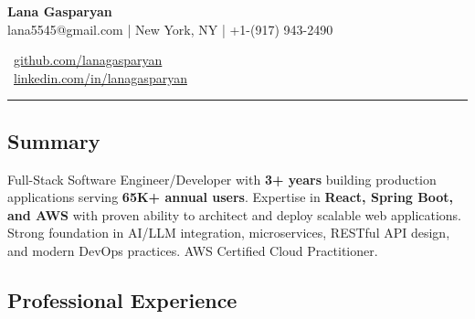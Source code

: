 \documentclass[11pt,letterpaper]{article}
\newcommand{\normalsizesection}{\normalsize}
\newcommand{\smallersection}{\small}
\newcommand{\sectionbox}[1]{%
    \vspace{0.1em}
    \begin{tcolorbox}[
        colback=sectionbg,
        colframe=sectionbg,
        width=\textwidth,
        left=5pt,
        right=5pt,
        top=2pt,
        bottom=2pt,
        boxrule=0pt,
        arc=0pt,
        boxsep=0pt,
    ]
    \section*{#1}
    \end{tcolorbox}
    \vspace{-0.4em}
}
\newcommand{\iconlink}[3]{%
    #1~\href{#2}{#3}%
}
\begin{document}
\begin{minipage}[t]{0.6\textwidth}
    \vspace{0pt}
    \fontsize{24pt}{28pt}\selectfont\textbf{\color{namecolor}Lana Gasparyan}\\[8pt]
    \footnotesize lana5545@gmail.com | New York, NY | +1-(917) 943-2490
\end{minipage}%
\begin{minipage}[t]{0.4\textwidth}
    \vspace{0pt}
    \raggedright
    \footnotesize\iconlink{\faGithub}{https://github.com/lanagasparyan}{github.com/lanagasparyan}\\
    \footnotesize\iconlink{\faLinkedin}{https://www.linkedin.com/in/lanagasparyan}{linkedin.com/in/lanagasparyan}
\end{minipage}

\vspace{-1mm}
\noindent\rule{\textwidth}{0.4pt}
\vspace{-4mm}

\sectionbox{Summary}
\smallersection

\noindent Full-Stack Software Engineer/Developer with \textbf{3+ years} building production applications serving \textbf{65K+ annual users}. Expertise in \textbf{React, Spring Boot, and AWS} with proven ability to architect and deploy scalable web applications. Strong foundation in AI/LLM integration, microservices, RESTful API design, and modern DevOps practices. AWS Certified Cloud Practitioner.

\normalsizesection

\sectionbox{Professional Experience}
\smallersection
\end{document}
